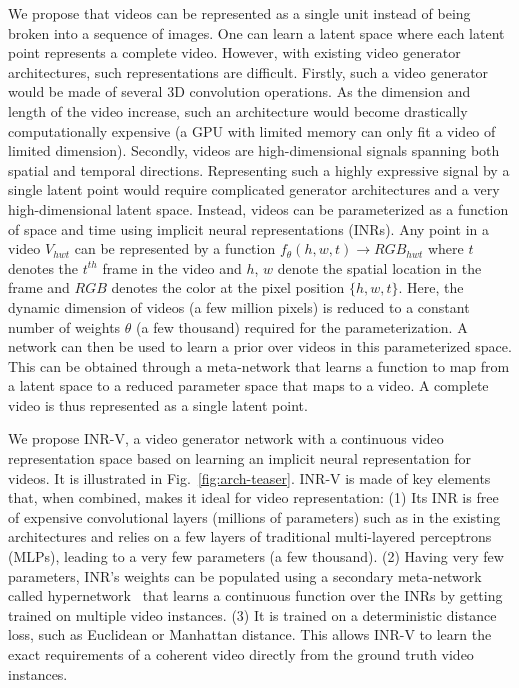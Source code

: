 \documentclass[10pt]{article} \usepackage[accepted]{tmlr}
\begin{document}
We propose that videos can be represented as a single unit instead of being broken into a sequence of images. 
One can learn a latent space where each latent point represents a complete video. 
However, with existing video generator architectures, 
such representations are difficult. Firstly, such a video generator would be made of several $3$D convolution operations. As the dimension and length of the video increase, such an architecture would become drastically computationally expensive (a GPU with limited memory can only fit a video of limited dimension). Secondly, videos are high-dimensional signals spanning both spatial and temporal directions. Representing such a highly expressive signal by a single latent point would require complicated generator architectures and a very high-dimensional latent space. Instead, videos can be parameterized as a function of space and time using implicit neural representations (INRs). Any point in a video $V_{hwt}$ can be represented by a function $f_\theta(h, w, t) \rightarrow RGB_{hwt}$ where $t$ denotes the $t^{th}$ frame in the video and $h$, $w$ denote the spatial location in the frame and $RGB$ denotes the color at the pixel position $\{h,w,t\}$. Here, the dynamic dimension of videos (a few million pixels) is reduced to a constant number of weights $\theta$ (a few thousand) required for the parameterization. A network can then be used to learn a prior over videos in this parameterized space. This can be obtained through a meta-network that learns a function to map from a latent space to a reduced parameter space that maps to a video. A complete video is thus represented as a single latent point.

We propose INR-V, a video generator network with a continuous video representation space based on learning an implicit neural representation for videos. It is illustrated in Fig.~\ref{fig:arch-teaser}. INR-V is made of key elements that, when combined, makes it ideal for video representation: (1) 
Its INR is free of expensive convolutional layers (millions of parameters) such as in the existing architectures \cite{mocogan-hd, stylegan-v} and relies on a few layers of traditional multi-layered perceptrons (MLPs), leading to a very few parameters (a few thousand).
(2) Having very few parameters, INR's weights can be populated using a secondary meta-network called hypernetwork~\cite{hypernetwork}
that learns a continuous function over the INRs by getting trained on multiple video instances.
(3) It is trained on a deterministic distance loss, such as Euclidean or Manhattan distance. This allows INR-V to learn the exact requirements of a coherent video directly from the ground truth video instances.
\end{document}
